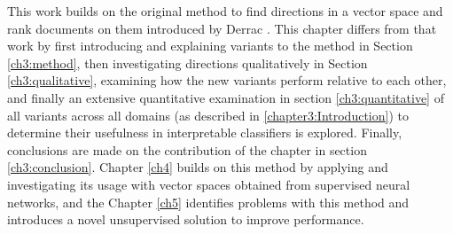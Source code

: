 This work builds on the original method to find directions in a vector space and rank documents on them introduced by Derrac \cite {Derrac2015}. This chapter differs from that work by first introducing and explaining variants to the method in Section \ref{ch3:method}, then investigating directions qualitatively in Section \ref{ch3:qualitative}, examining how the new variants perform relative to each other, and finally an extensive quantitative examination in section \ref{ch3:quantitative} of all variants across all domains (as described in \ref{chapter3:Introduction}) to determine their usefulness in interpretable classifiers is explored.  Finally, conclusions are made on the contribution of the chapter in section \ref{ch3:conclusion}. Chapter \ref{ch4} builds on this method by applying and investigating its usage with vector spaces obtained from supervised neural networks, and the Chapter \ref{ch5} identifies problems with this method and introduces a novel unsupervised solution to improve performance.












 






